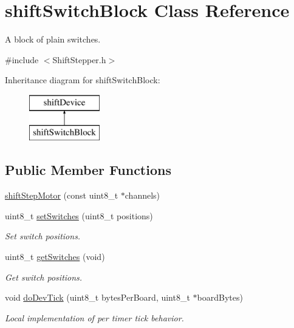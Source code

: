 \hypertarget{classshift_switch_block}{
\section{shiftSwitchBlock Class Reference}
\label{classshift_switch_block}
}


A block of plain switches.  




{\ttfamily \#include $<$ShiftStepper.h$>$}

Inheritance diagram for shiftSwitchBlock:\begin{figure}[H]
\begin{center}
\leavevmode
\includegraphics[height=2.000000cm]{classshift_switch_block}
\end{center}
\end{figure}
\subsection*{Public Member Functions}
\begin{DoxyCompactItemize}
\item 
\hyperlink{classshift_switch_block_a455f9d6bb935de28027746d01a14814c}{shiftStepMotor} (const uint8\_\-t $\ast$channels)
\item 
uint8\_\-t \hyperlink{classshift_switch_block_abc0f22095833ef9f9d84ae8b29934357}{setSwitches} (uint8\_\-t positions)
\begin{DoxyCompactList}\small\item\em Set switch positions. \item\end{DoxyCompactList}\item 
uint8\_\-t \hyperlink{classshift_switch_block_a292a158fc742c52f2227728c024e9e70}{getSwitches} (void)
\begin{DoxyCompactList}\small\item\em Get switch positions. \item\end{DoxyCompactList}\item 
void \hyperlink{classshift_switch_block_ab6bbc5883fc7d966103df29d40ae012e}{doDevTick} (uint8\_\-t bytesPerBoard, uint8\_\-t $\ast$boardBytes)
\begin{DoxyCompactList}\small\item\em Local implementation of per timer tick behavior. \item\end{DoxyCompactList}\end{DoxyCompactItemize}


